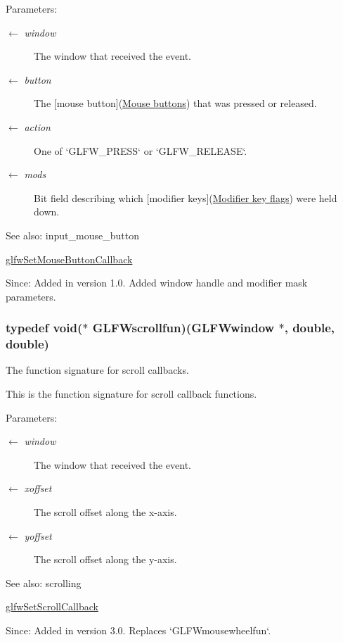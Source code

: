 \begin{Desc}
\item[Parameters:]
\begin{description}
\item[\mbox{$\leftarrow$} {\em window}]The window that received the event. \item[\mbox{$\leftarrow$} {\em button}]The \mbox{[}mouse button\mbox{]}(\hyperlink{group__buttons}{Mouse buttons}) that was pressed or released. \item[\mbox{$\leftarrow$} {\em action}]One of `GLFW\_\-PRESS` or `GLFW\_\-RELEASE`. \item[\mbox{$\leftarrow$} {\em mods}]Bit field describing which \mbox{[}modifier keys\mbox{]}(\hyperlink{group__mods}{Modifier key flags}) were held down.\end{description}
\end{Desc}
\begin{Desc}
\item[See also:]input\_\-mouse\_\-button 

\hyperlink{group__input_g20e5ba1ce4e086aedd48a06dc311c95f}{glfwSetMouseButtonCallback}\end{Desc}
\begin{Desc}
\item[Since:]Added in version 1.0.  Added window handle and modifier mask parameters. \end{Desc}
\hypertarget{group__input_g6228cdf94d28fbd3a9a1fbb0e5922a8a}{
\subsubsection[GLFWscrollfun]{\setlength{\rightskip}{0pt plus 5cm}typedef void($\ast$  {\bf GLFWscrollfun})({\bf GLFWwindow} $\ast$, double, double)}}
\label{group__input_g6228cdf94d28fbd3a9a1fbb0e5922a8a}


The function signature for scroll callbacks. 

This is the function signature for scroll callback functions.

\begin{Desc}
\item[Parameters:]
\begin{description}
\item[\mbox{$\leftarrow$} {\em window}]The window that received the event. \item[\mbox{$\leftarrow$} {\em xoffset}]The scroll offset along the x-axis. \item[\mbox{$\leftarrow$} {\em yoffset}]The scroll offset along the y-axis.\end{description}
\end{Desc}
\begin{Desc}
\item[See also:]scrolling 

\hyperlink{group__input_g29011514e93368712a3063a28707ced3}{glfwSetScrollCallback}\end{Desc}
\begin{Desc}
\item[Since:]Added in version 3.0. Replaces `GLFWmousewheelfun`. \end{Desc}


